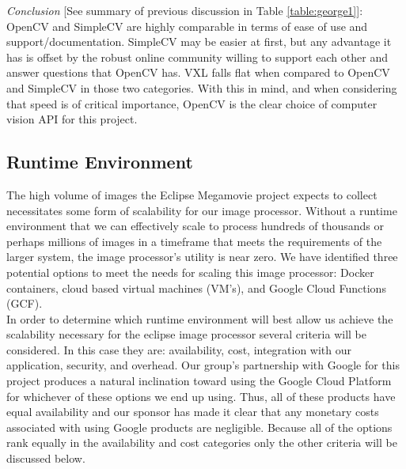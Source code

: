 \documentclass[10pt, onecolumn, draftclsnofoot, letterpaper, compsoc]{IEEEtran}
\begin{document}
\textit{Conclusion} [See summary of previous discussion in Table
\ref{table:george1}]: OpenCV and SimpleCV are highly comparable in terms of ease
of use and support/documentation. SimpleCV may be easier at first, but any
advantage it has is offset by the robust online community willing to support
each other and answer questions that OpenCV has. VXL falls flat when compared to
OpenCV and SimpleCV in those two categories. With this in mind, and when
considering that speed is of critical importance, OpenCV is the clear choice of
computer vision API for this project.

\subsection{Runtime Environment}

The high volume of images the Eclipse Megamovie project expects to collect
necessitates some form of scalability for our image processor. Without a runtime
environment that we can effectively scale to process hundreds of thousands or
perhaps millions of images in a timeframe that meets the requirements of the
larger system, the image processor's utility is near zero. We have identified
three potential options to meet the needs for scaling this image processor:
Docker containers, cloud based virtual machines (VM's), and Google Cloud
Functions (GCF).\\

In order to determine which runtime environment will best allow us achieve the
scalability necessary for the eclipse image processor several criteria will be
considered. In this case they are: availability, cost, integration with our
application, security, and overhead. Our group's partnership with Google for
this project produces a natural inclination toward using the Google Cloud
Platform for whichever of these options we end up using. Thus, all of these
products have equal availability and our sponsor has made it clear that any
monetary costs associated with using Google products are negligible. Because all
of the options rank equally in the availability and cost categories only the
other criteria will be discussed below. \\
\end{document}
